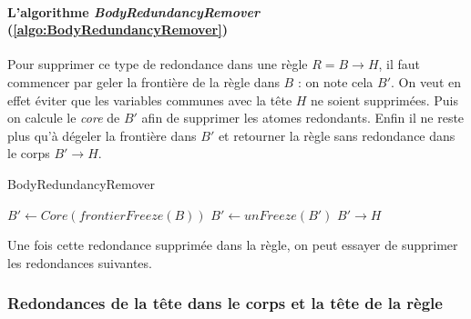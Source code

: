 \paragraph{L'algorithme \textit{BodyRedundancyRemover} (\ref{algo:BodyRedundancyRemover})} Pour supprimer ce type de redondance dans une règle $R = B \rightarrow H$, il faut commencer par geler la frontière de la règle dans $B$ : on note cela $B'$. On veut en effet éviter que les variables communes avec la tête $H$ ne soient supprimées. Puis on calcule le \textit{core} de $B'$ afin de supprimer les atomes redondants. Enfin il ne reste plus qu'à dégeler la frontière dans $B'$ et retourner la règle sans redondance dans le corps $B' \rightarrow H$.
\newline
{}
\begin{algorithm}[H]\label{algo:BodyRedundancyRemover}
\caption{BodyRedundancyRemover}
\SetAlgoLined
\DontPrintSemicolon
\SetAlgoLined
\DontPrintSemicolon
{}
        $B' \gets Core(frontierFreeze(B))$ \;
        $B' \gets unFreeze(B')$ \;
        \Return $B' \rightarrow H$ \;
\end{algorithm}



\par Une fois cette redondance supprimée dans la règle, on peut essayer de supprimer les redondances suivantes.  

\subsubsection{Redondances de la tête dans le corps et la tête de la règle}\label{sec:redondances_tete_corps}

